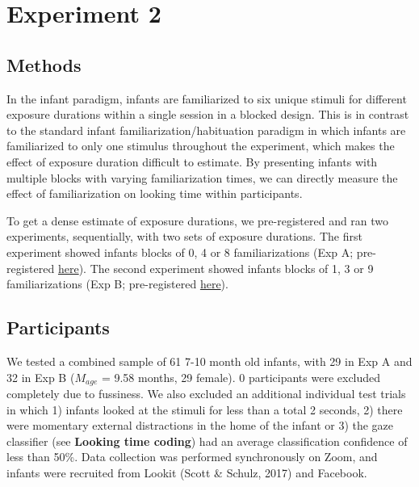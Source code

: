 \documentclass[10pt, letterpaper]{article}
\begin{document}
\hypertarget{experiment-2}{%
\section{Experiment 2}\label{experiment-2}}

\hypertarget{methods-1}{%
\subsection{Methods}\label{methods-1}}

In the infant paradigm, infants are familiarized to six unique stimuli
for different exposure durations within a single session in a blocked
design. This is in contrast to the standard infant
familiarization/habituation paradigm in which infants are familiarized
to only one stimulus throughout the experiment, which makes the effect
of exposure duration difficult to estimate. By presenting infants with
multiple blocks with varying familiarization times, we can directly
measure the effect of familiarization on looking time within
participants.

To get a dense estimate of exposure durations, we pre-registered and ran
two experiments, sequentially, with two sets of exposure durations. The
first experiment showed infants blocks of 0, 4 or 8 familiarizations
(Exp A; pre-registered
\href{https://osf.io/gux4f/?view_only=b4d6d0118dfa41a79fb431d389f4fecc}{here}).
The second experiment showed infants blocks of 1, 3 or 9
familiarizations (Exp B; pre-registered
\href{https://osf.io/w6pgu/?view_only=39ee108159884761a0c5bc68d11918df}{here}).

\hypertarget{participants-1}{%
\subsection{Participants}\label{participants-1}}

We tested a combined sample of 61 7-10 month old infants, with 29 in Exp
A and 32 in Exp B (\(M_{age}\) = 9.58 months, 29 female). 0 participants
were excluded completely due to fussiness. We also excluded an
additional individual test trials in which 1) infants looked at the
stimuli for less than a total 2 seconds, 2) there were momentary
external distractions in the home of the infant or 3) the gaze
classifier (see \textbf{Looking time coding}) had an average
classification confidence of less than 50\%. Data collection was
performed synchronously on Zoom, and infants were recruited from Lookit
(Scott \& Schulz, 2017) and Facebook.
\end{document}
